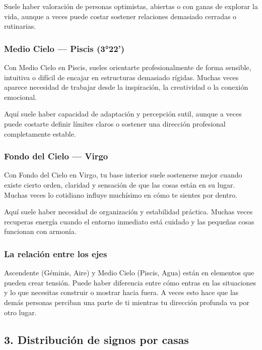 \documentclass[11pt,a4paper]{article}
\begin{document}
Suele haber valoración de personas optimistas, abiertas o con ganas de explorar la vida, aunque a veces puede costar sostener relaciones demasiado cerradas o rutinarias.

\subsubsection*{Medio Cielo — Piscis (3°22')}
Con Medio Cielo en Piscis, sueles orientarte profesionalmente de forma sensible, intuitiva o difícil de encajar en estructuras demasiado rígidas. Muchas veces aparece necesidad de trabajar desde la inspiración, la creatividad o la conexión emocional.

Aquí suele haber capacidad de adaptación y percepción sutil, aunque a veces puede costarte definir límites claros o sostener una dirección profesional completamente estable.

\subsubsection*{Fondo del Cielo — Virgo}
Con Fondo del Cielo en Virgo, tu base interior suele sostenerse mejor cuando existe cierto orden, claridad y sensación de que las cosas están en su lugar. Muchas veces lo cotidiano influye muchísimo en cómo te sientes por dentro.

Aquí suele haber necesidad de organización y estabilidad práctica. Muchas veces recuperas energía cuando el entorno inmediato está cuidado y las pequeñas cosas funcionan con armonía.

\subsubsection*{La relación entre los ejes}
Ascendente (Géminis, Aire) y Medio Cielo (Piscis, Agua) están en elementos que pueden crear tensión. Puede haber diferencia entre cómo entras en las situaciones y lo que necesitas construir o mostrar hacia fuera. A veces esto hace que las demás personas perciban una parte de ti mientras tu dirección profunda va por otro lugar.

\vspace{0.5cm}

\subsection{3. Distribución de signos por casas}
\end{document}

